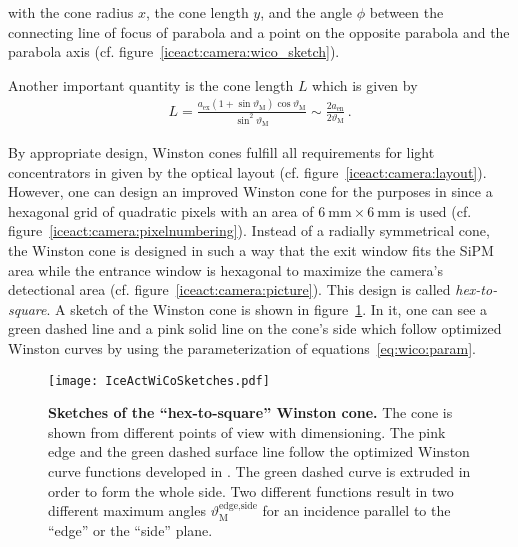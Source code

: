with the cone radius $x$, the cone length $y$, and the angle $\phi$ between the connecting line of focus of parabola and a point on the opposite parabola and the parabola axis (cf. figure~\ref{iceact:camera:wico_sketch}).

Another important quantity is the cone length $L$ which is given by \cite{wico:book,iceact:camera}
\begin{align}
	L = \frac{a_\text{ex}(1+\sin\vartheta_\text{M})\cos\vartheta_\text{M}}{\sin^2\vartheta_\text{M}}\sim\frac{2a_\text{en}}{2\vartheta_\text{M}}\,.
\end{align}






By appropriate design, Winston cones fulfill all requirements for light concentrators in \iceact given by the optical layout (cf. figure~\ref{iceact:camera:layout}).
However, one can design an improved Winston cone for the purposes in \iceact since a hexagonal grid of quadratic pixels with an area of $\SI{6}{\milli\meter}\times\SI{6}{\milli\meter}$ is used (cf. figure~\ref{iceact:camera:pixelnumbering}). Instead of a radially symmetrical cone, the \iceact Winston cone is designed in such a way that the exit window fits the SiPM area while the entrance window is hexagonal to maximize the camera's detectional area (cf. figure~\ref{iceact:camera:picture}). This design is called \textit{hex-to-square}. A sketch of the \iceact Winston cone is shown in figure~\ref{iceact:camera:iceact_wico_sketch}. In it, one can see a green dashed line and a pink solid line on the cone's side which follow optimized Winston curves by using the parameterization of equations~\eqref{eq:wico:param}.

\begin{figure}[H]
	\centering
	\texttt{[image: IceActWiCoSketches.pdf]}
	\caption[Sketches of the \iceact \enquote{hex-to-square} Winston cone]{\textbf{Sketches of the \iceact \enquote{hex-to-square} Winston cone.} The cone is shown from different points of view with dimensioning. The pink edge and the green dashed surface line follow the optimized Winston curve functions developed in \cite{iceact:camera}. The green dashed curve is extruded in order to form the whole side. Two different functions result in two different maximum angles $\vartheta_\text{M}^\text{edge,side}$ for an incidence parallel to the \enquote{edge} or the \enquote{side} plane.}
	\label{iceact:camera:iceact_wico_sketch}	
\end{figure}

